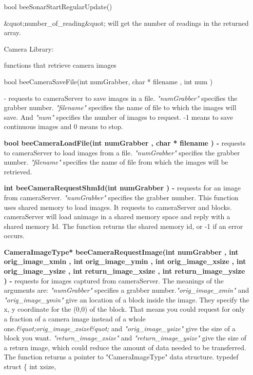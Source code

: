 {\begin{enumerate}{\bf \item bool
    beeSonarStartRegularUpdate()}
{    \&quot;number\_of\_reading\&quot;} will get the number of readings
  in the returned array. \end{enumerate}{\bf \par Camera Library:
  }functions that retrieve camera images\par \begin{enumerate}{\bf
  \item bool beeCameraSaveFile(int numGrabber, char * filename , int
    num )}- requests to cameraServer to save images in a file. {\it
    "numGrabber"} specifies the grabber number.  {\it "filename"
    }specifies the name of file to which the images will save. And
  {\it "num"} specifies the number of images to request. -1 means to
  save continuous images and 0 means to stop.\item {\bf bool
    beeCameraLoadFile(int numGrabber , char * filename ) - }requests
  to cameraServer to load images from a file. {\it "numGrabber"}
  specifies the grabber number. {\it "filename" }specifies the name of
  file from which the images will be retrieved. \item {\bf int
    beeCameraRequestShmId(int numGrabber ) - }requests for an image
  from cameraServer. {\it "numGrabber"} specifies the grabber number.
  This function uses shared memory to load images. It requests to
  cameraServer and blocks. cameraServer will load an{\bf }image in a
  shared memory space and reply with a shared memory Id. The function
  returns the shared memory id, or -1 if an error occurs. \item {\bf
    CameraImageType* beeCameraRequestImage(int numGrabber , int
    orig\_image\_xmin , int orig\_image\_ymin , int orig\_image\_xsize
    , int orig\_image\_ysize , int return\_image\_xsize , int
    return\_image\_ysize ) - }requests for images captured from
  cameraServer. The meanings of the arguments are: {\it "numGrabber"}
  specifies a grabber number.{\it "orig\_image\_xmin"} and {\it
    "orig\_image\_ymin"} give an location of a block inside the image.
  They specify the x, y coordinate for the (0,0) of the block. That
  means you could request for only a fraction of a camera image
  instead of a whole one.{\it \&quot;orig\_image\_xsize\&quot;} and
  {\it "orig\_image\_ysize" }give the size of a block you want. {\it
    "return\_image\_xsize"} and {\it "return\_image\_ysize"} give the
  size of a return image, which could reduce the amount of data needed
  to be transferred.  The function returns a pointer to
  "CameraImageType" data structure.  typedef struct \{ int xsize,

\end{enumerate}}
